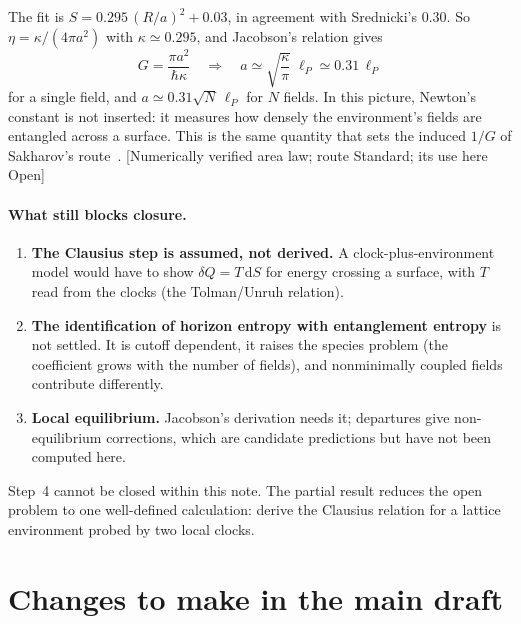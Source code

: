 \documentclass[11pt]{article}
\newcommand{\dd}{\mathrm{d}}
\newcommand{\st}[1]{\textsf{\small[#1]}}
\theoremstyle{plain}
\theoremstyle{definition}
\theoremstyle{remark}
\begin{document}
The fit is $S=0.295\,(R/a)^2+0.03$, in agreement with Srednicki's $0.30$. So $\eta=\kappa/(4\pi a^2)$ with $\kappa\simeq0.295$, and Jacobson's relation gives
\begin{equation}
G=\frac{\pi a^2}{\hbar\kappa}\quad\Longrightarrow\quad a\simeq\sqrt{\frac{\kappa}{\pi}}\;\ell_P\simeq0.31\,\ell_P
\end{equation}
for a single field, and $a\simeq0.31\sqrt{N}\,\ell_P$ for $N$ fields. In this picture, Newton's constant is not inserted: it measures how densely the environment's fields are entangled across a surface. This is the same quantity that sets the induced $1/G$ of Sakharov's route~\cite{Jacobson1994}. \st{Numerically verified area law; route Standard; its use here Open}

\paragraph{What still blocks closure.}
\begin{enumerate}[1.]
\item \textbf{The Clausius step is assumed, not derived.} A clock-plus-environment model would have to show $\delta Q=T\,\dd S$ for energy crossing a surface, with $T$ read from the clocks (the Tolman/Unruh relation).
\item \textbf{The identification of horizon entropy with entanglement entropy} is not settled. It is cutoff dependent, it raises the species problem (the coefficient grows with the number of fields), and nonminimally coupled fields contribute differently.
\item \textbf{Local equilibrium.} Jacobson's derivation needs it; departures give non-equilibrium corrections, which are candidate predictions but have not been computed here.
\end{enumerate}
Step~4 cannot be closed within this note. The partial result reduces the open problem to one well-defined calculation: derive the Clausius relation for a lattice environment probed by two local clocks.

\section{Changes to make in the main draft}
\end{document}
